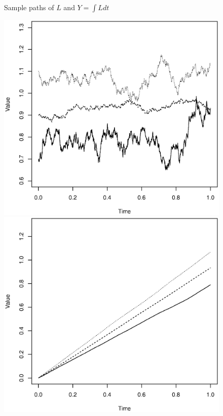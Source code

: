 \documentclass[12pt]{article}
\theoremstyle{definition}
\begin{document}
\begin{figure}[htb]
\begin{framed}
Sample paths of \({L}\) and \({Y}=\int {L} dt\) \newline
\begin{minipage}[t]{.48\textwidth}
\centering
\includegraphics[width=1\textwidth]{StahlPaper2Z}
\caption{ \label{fig1}}
\end{minipage}\hfill
\begin{minipage}[t]{.48\textwidth}
\centering
\includegraphics[width=1\textwidth]{StahlPaper2Y}
\caption{ \label{fig2}}
\end{minipage}\hfill
\end{framed}
\end{figure}
\end{document}
